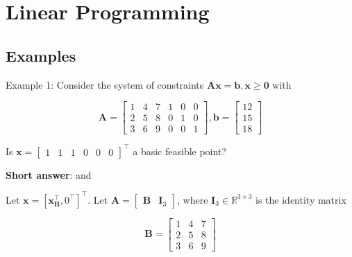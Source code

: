 \section{Linear Programming}

\subsection{Examples}
Example 1: Consider the system of constraints \(\boldsymbol{A} \boldsymbol{x}=\boldsymbol{b}, \boldsymbol{x} \geq \boldsymbol{0}\) with

\begin{equation*}
	\boldsymbol{A}=\left[\begin{array}{llllll}
		1 & 4 & 7 & 1 & 0 & 0 \\
		2 & 5 & 8 & 0 & 1 & 0 \\
		3 & 6 & 9 & 0 & 0 & 1
	\end{array}\right], \boldsymbol{b}=\left[\begin{array}{l}
		12 \\
		15 \\
		18
	\end{array}\right]
\end{equation*}

Is \(\boldsymbol{x}=\left[\begin{array}{llllll}1 & 1 & 1 & 0 & 0 & 0\end{array}\right]^{\top}\) a basic feasible point?

\textbf{Short answer}:
and

Let \(\boldsymbol{x}=\left[\boldsymbol{x}_{\boldsymbol{B}}^{\top}, 0^{\top}\right]^{\top}\). Let \(\boldsymbol{A}=\left[\begin{array}{ll}\boldsymbol{B} & \boldsymbol{I}_{3}\end{array}\right]\), where \(\boldsymbol{I}_{3} \in \mathbb{R}^{3 \times 3}\) is the identity matrix

\begin{equation*}
	\boldsymbol{B}=\left[\begin{array}{lll}
		1 & 4 & 7 \\
		2 & 5 & 8 \\
		3 & 6 & 9
	\end{array}\right]
\end{equation*}

